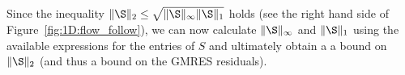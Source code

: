 
Since the inequality $\|\S\|_2\leq\sqrt{\|\S\|_{\infty}\|\S\|_{1}}$ holds (see
the right hand side of Figure~\ref{fig:1D:flow_follow}), we can now calculate
$\|\S\|_{\infty}$ and $\|\S\|_{1}$ using the available expressions for the
entries of $S$ and ultimately obtain a a bound on $\|\S\|_{2}$ (and thus a bound
on the GMRES residuals).

